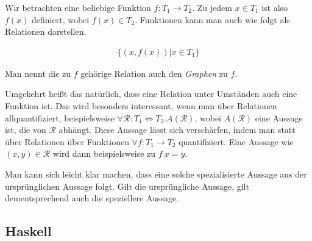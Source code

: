 Wir betrachten eine beliebige Funktion $f : T_1 \rightarrow T_2$. Zu jedem $x \in T_1$ ist also $f(x)$ definiert, wobei $f(x) \in T_2$. Funktionen kann man auch wie folgt als Relationen darstellen.

\begin{align*}
\{ (x, f(x)) | x \in T_1 \}
\end{align*}

Man nennt die zu $f$ gehörige Relation auch den \textit{Graphen} zu $f$.

Umgekehrt heißt das natürlich, dass eine Relation unter Umständen auch eine Funktion ist. Das wird besonders interessant, wenn man
über Relationen allquantifiziert, beispielsweise $\forall \mathcal{R} : T_1 \Leftrightarrow T_2 . A(\mathcal{R})$, wobei $A(\mathcal{R})$
eine Aussage ist, die von $\mathcal{R}$ abhängt.
Diese Aussage lässt sich verschärfen, indem man statt über Relationen über Funktionen $\forall f : T_1 \rightarrow T_2$ quantifiziert.
Eine Aussage wie  $(x, y) \in \mathcal{R}$ wird dann beispielsweise zu $f\ x = y$.

Man kann sich leicht klar machen, dass eine solche spezialisierte Aussage aus der ursprünglichen Aussage folgt. Gilt die ursprüngliche
Aussage, gilt dementsprechend auch die speziellere Aussage.

%
%


\subsection{Haskell}

